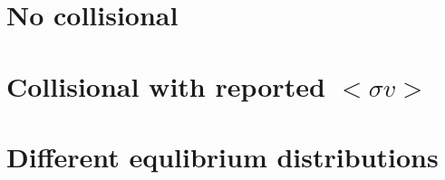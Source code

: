 \section{No collisional}
\section{Collisional with reported $<\sigma v>$}
\section{Different equlibrium distributions}










